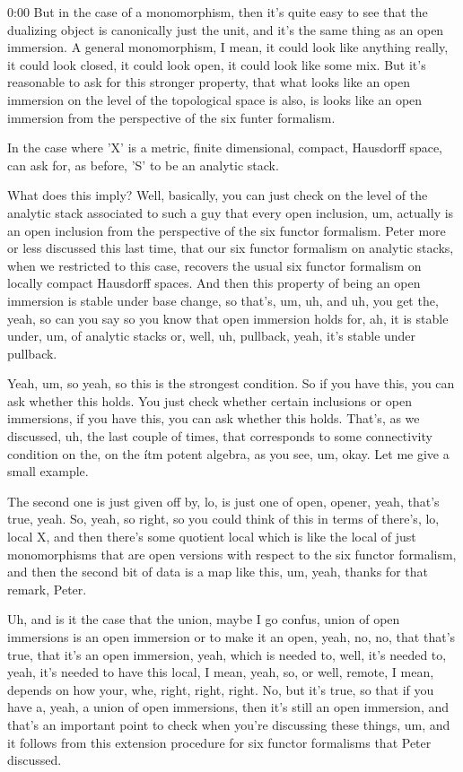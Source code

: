\begin{unfinished}{0:00}
But in the case of a monomorphism, then it's quite easy to see that the dualizing object is canonically just the unit, and it's the same thing as an open immersion. A general monomorphism, I mean, it could look like anything really, it could look closed, it could look open, it could look like some mix. But it's reasonable to ask for this stronger property, that what looks like an open immersion on the level of the topological space is also, is looks like an open immersion from the perspective of the six funter formalism.

In the case where 'X' is a metric, finite dimensional, compact, Hausdorff space, can ask for, as before, 'S' to be an analytic stack.

What does this imply? Well, basically, you can just check on the level of the analytic stack associated to such a guy that every open inclusion, um, actually is an open inclusion from the perspective of the six functor formalism. Peter more or less discussed this last time, that our six functor formalism on analytic stacks, when we restricted to this case, recovers the usual six functor formalism on locally compact Hausdorff spaces. And then this property of being an open immersion is stable under base change, so that's, um, uh, and uh, you get the, yeah, so can you say so you know that open immersion holds for, ah, it is stable under, um, of analytic stacks or, well, uh, pullback, yeah, it's stable under pullback.

Yeah, um, so yeah, so this is the strongest condition. So if you have this, you can ask whether this holds. You just check whether certain inclusions or open immersions, if you have this, you can ask whether this holds. That's, as we discussed, uh, the last couple of times, that corresponds to some connectivity condition on the, on the ítm potent algebra, as you see, um, okay. Let me give a small example.

The second one is just given off by, lo, is just one of open, opener, yeah, that's true, yeah. So, yeah, so right, so you could think of this in terms of there's, lo, local X, and then there's some quotient local which is like the local of just monomorphisms that are open versions with respect to the six functor formalism, and then the second bit of data is a map like this, um, yeah, thanks for that remark, Peter.

Uh, and is it the case that the union, maybe I go confus, union of open immersions is an open immersion or to make it an open, yeah, no, no, that that's true, that it's an open immersion, yeah, which is needed to, well, it's needed to, yeah, it's needed to have this local, I mean, yeah, so, or well, remote, I mean, depends on how your, whe, right, right, right. No, but it's true, so that if you have a, yeah, a union of open immersions, then it's still an open immersion, and that's an important point to check when you're discussing these things, um, and it follows from this extension procedure for six functor formalisms that Peter discussed.


\end{unfinished}
